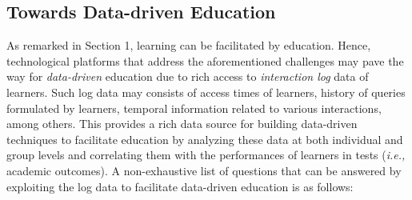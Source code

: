 \documentclass[11pt]{article}
\newcommand{\ie}{\emph{i.e.,}\xspace}
\begin{document}
\subsection{Towards Data-driven Education} 
As remarked in Section 1, learning can be facilitated  by education. Hence, technological platforms that address the aforementioned challenges may pave the way for \emph{data-driven} education due to rich access to \textit{interaction log} data of learners.  Such log data may consists of access times of learners, history of queries formulated by learners, temporal information related to various interactions, among others. This provides a rich data source for building data-driven techniques to facilitate education by analyzing these data at both individual and group levels and correlating them with the performances of learners in tests (\ie academic outcomes).  A non-exhaustive list of questions that can be answered by exploiting the log data to facilitate data-driven education is as follows:
\end{document}
